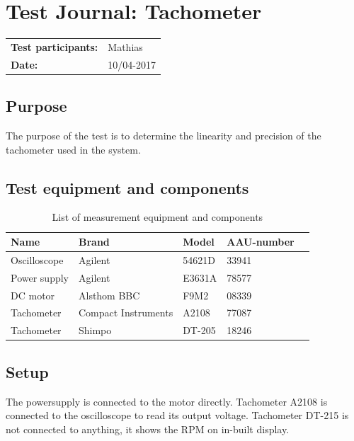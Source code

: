 \graphicspath{{figures/design/}}
\chapter{Test Journal: Tachometer}\label{appendix:RPMTest}
\begin{table}[!h]
\begin{tabular}{l l}
\textbf{Test participants:} & Mathias  \\
\textbf{Date:}  & 10/04-2017
\end{tabular}
\end{table}

\section*{Purpose}
The purpose of the test is to determine the linearity and precision of the tachometer used in the system.
\section*{Test equipment and components}
\begin{table}[htbp]
	\centering
	\caption{List of measurement equipment and components}\label{tab_appendix:RPMSetup}
	\begin{tabularx}{\textwidth}{lXXXX}
		Name & Brand & Model & AAU-number \\ \toprule \rowcolor{lightGrey}
		Oscilloscope	& Agilent & 54621D & 33941 	\\
		Power supply	& Agilent & E3631A & 78577\\ 
		\rowcolor{lightGrey}	
		DC motor & Alsthom BBC & F9M2& 08339\\
		Tachometer & Compact \newline Instruments & A2108& 77087 \\ \rowcolor{lightGrey}
		Tachometer & Shimpo& DT-205 & 18246
	\end{tabularx}
\end{table}
\section*{Setup}
The powersupply is connected to the motor directly. Tachometer A2108 is connected to the oscilloscope to read its output voltage. Tachometer DT-215 is not connected to anything, it shows the RPM on in-built display.  
